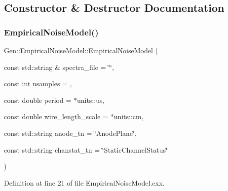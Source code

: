 \subsection{Constructor \& Destructor Documentation}
\mbox{\label{class_wire_cell_1_1_gen_1_1_empirical_noise_model_a3478b5daf202fbb7f923664ac21fdeb5}} 
\subsubsection{\texorpdfstring{Empirical\+Noise\+Model()}{EmpiricalNoiseModel()}}
{\footnotesize\ttfamily Gen\+::\+Empirical\+Noise\+Model\+::\+Empirical\+Noise\+Model (\begin{DoxyParamCaption}\item[{const std\+::string \&}]{spectra\+\_\+file = {\ttfamily \char`\"{}\char`\"{}},  }\item[{const int}]{nsamples = {},  }\item[{const double}]{period = {$\ast$units\+:\+:us},  }\item[{const double}]{wire\+\_\+length\+\_\+scale = {$\ast$units\+:\+:cm},  }\item[{const std\+::string}]{anode\+\_\+tn = {\ttfamily \char`\"{}AnodePlane\char`\"{}},  }\item[{const std\+::string}]{chanstat\+\_\+tn = {\ttfamily \char`\"{}StaticChannelStatus\char`\"{}} }\end{DoxyParamCaption})}



Definition at line 21 of file Empirical\+Noise\+Model.\+cxx.

